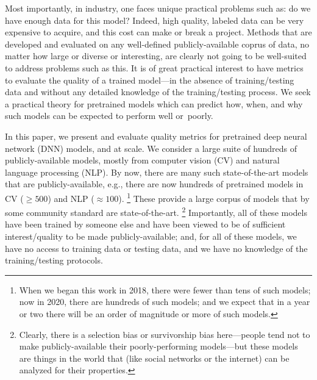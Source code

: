 Most importantly, in industry, one faces unique practical problems such as: do we have enough data for this model? 
Indeed, high quality, labeled data can be very expensive to acquire, and this cost can make or break a project.
Methods that are developed and evaluated on any well-defined publicly-available coprus of data, no matter how large or diverse or interesting, are clearly not going to be well-suited to address problems such as this.
It is of great practical interest to have metrics to evaluate the quality of a trained model---in the absence of training/testing data and without any detailed knowledge of the training/testing process.  
We seek a practical theory for pretrained models which can predict how, when, and why such models can be expected to perform well or~poorly.

In this paper, we present and evaluate quality metrics for pretrained deep neural network (DNN) models, and at scale.
We consider a large suite of hundreds of publicly-available models, mostly from computer vision (CV) and natural language processing (NLP).
%
By now, there are many such state-of-the-art models that are publicly-available, e.g., 
there are now hundreds of pretrained models in CV ($\ge 500$) and NLP ($\approx 100$).%
\footnote{When we began this work in 2018, there were fewer than tens of such models; now in 2020, there are hundreds of such models; and we expect that in a year or two there will be an order of magnitude or more of such models.}
These provide a large corpus of models that by some community standard are state-of-the-art.%
\footnote{Clearly, there is a selection bias or survivorship bias here---people tend not to make publicly-available their poorly-performing models---but these models are things in the world that (like social networks or the internet) can be analyzed for their properties.}
Importantly, all of these models have been trained by someone else and have been viewed to be of sufficient interest/quality to be made publicly-available; and, for all of these models, we have no access to training data or testing data, and we have no knowledge of the training/testing protocols. 

